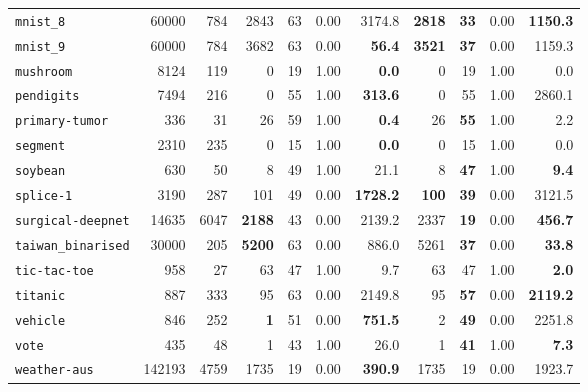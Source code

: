 \begin{tabular}{lccrrrrrrrr}
\texttt{mnist\_8} & \multicolumn{1}{r}{60000} & \multicolumn{1}{r}{784}  & 2843 & 63 & 0.00 & 3174.8 & \textbf{2818} & \textbf{33} & 0.00 & \textbf{1150.3}\\
\texttt{mnist\_9} & \multicolumn{1}{r}{60000} & \multicolumn{1}{r}{784}  & 3682 & 63 & 0.00 & \textbf{56.4} & \textbf{3521} & \textbf{37} & 0.00 & 1159.3\\
\texttt{mushroom} & \multicolumn{1}{r}{8124} & \multicolumn{1}{r}{119}  & 0 & 19 & 1.00 & \textbf{0.0} & 0 & 19 & 1.00 & 0.0\\
\texttt{pendigits} & \multicolumn{1}{r}{7494} & \multicolumn{1}{r}{216}  & 0 & 55 & 1.00 & \textbf{313.6} & 0 & 55 & 1.00 & 2860.1\\
\texttt{primary-tumor} & \multicolumn{1}{r}{336} & \multicolumn{1}{r}{31}  & 26 & 59 & 1.00 & \textbf{0.4} & 26 & \textbf{55} & 1.00 & 2.2\\
\texttt{segment} & \multicolumn{1}{r}{2310} & \multicolumn{1}{r}{235}  & 0 & 15 & 1.00 & \textbf{0.0} & 0 & 15 & 1.00 & 0.0\\
\texttt{soybean} & \multicolumn{1}{r}{630} & \multicolumn{1}{r}{50}  & 8 & 49 & 1.00 & 21.1 & 8 & \textbf{47} & 1.00 & \textbf{9.4}\\
\texttt{splice-1} & \multicolumn{1}{r}{3190} & \multicolumn{1}{r}{287}  & 101 & 49 & 0.00 & \textbf{1728.2} & \textbf{100} & \textbf{39} & 0.00 & 3121.5\\
\texttt{surgical-deepnet} & \multicolumn{1}{r}{14635} & \multicolumn{1}{r}{6047}  & \textbf{2188} & 43 & 0.00 & 2139.2 & 2337 & \textbf{19} & 0.00 & \textbf{456.7}\\
\texttt{taiwan\_binarised} & \multicolumn{1}{r}{30000} & \multicolumn{1}{r}{205}  & \textbf{5200} & 63 & 0.00 & 886.0 & 5261 & \textbf{37} & 0.00 & \textbf{33.8}\\
\texttt{tic-tac-toe} & \multicolumn{1}{r}{958} & \multicolumn{1}{r}{27}  & 63 & 47 & 1.00 & 9.7 & 63 & 47 & 1.00 & \textbf{2.0}\\
\texttt{titanic} & \multicolumn{1}{r}{887} & \multicolumn{1}{r}{333}  & 95 & 63 & 0.00 & 2149.8 & 95 & \textbf{57} & 0.00 & \textbf{2119.2}\\
\texttt{vehicle} & \multicolumn{1}{r}{846} & \multicolumn{1}{r}{252}  & \textbf{1} & 51 & 0.00 & \textbf{751.5} & 2 & \textbf{49} & 0.00 & 2251.8\\
\texttt{vote} & \multicolumn{1}{r}{435} & \multicolumn{1}{r}{48}  & 1 & 43 & 1.00 & 26.0 & 1 & \textbf{41} & 1.00 & \textbf{7.3}\\
\texttt{weather-aus} & \multicolumn{1}{r}{142193} & \multicolumn{1}{r}{4759}  & 1735 & 19 & 0.00 & \textbf{390.9} & 1735 & 19 & 0.00 & 1923.7\\

\end{tabular}
